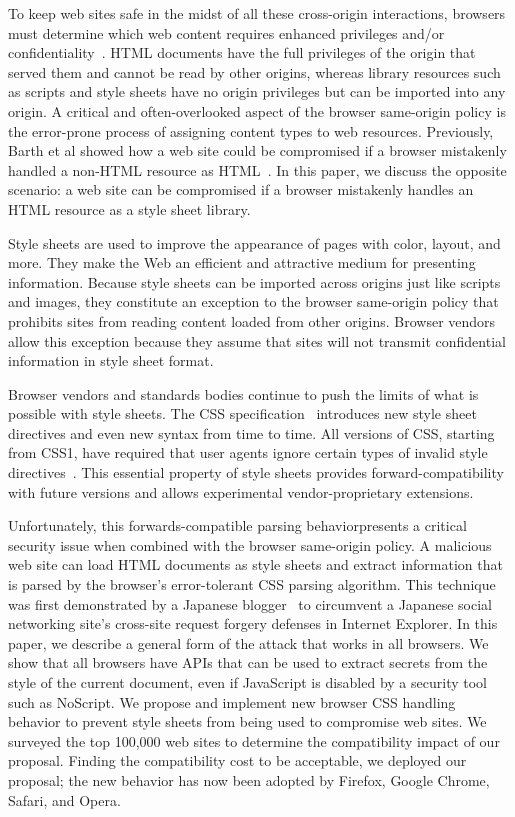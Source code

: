 \documentclass{acm_proc_article-sp}
\begin{document}
To keep web sites safe in the midst of all these cross-origin interactions,
browsers must determine which web content requires enhanced privileges and/or
confidentiality~\cite{mashupos}. HTML documents have the full privileges of
the origin that served them and cannot be read by other origins, whereas
library resources such as scripts and style sheets have no origin privileges
but can be imported into any origin. A critical and often-overlooked aspect of
the browser same-origin policy is the error-prone process of assigning content types to web resources. Previously, Barth et al showed how a web site could be
compromised if a browser mistakenly handled a non-HTML resource as
HTML~\cite{securecontentsniffing}. In this paper, we discuss the opposite
scenario: a web site can be compromised if a browser mistakenly handles an
HTML resource as a style sheet library.

Style sheets are used to improve the appearance of pages with
color, layout, and more. They make the Web an efficient and attractive medium
for presenting information. Because style sheets can be imported across
origins just like scripts and images, they constitute an exception to the
browser same-origin policy that prohibits sites from reading content loaded
from other origins. Browser vendors allow this exception because they assume
that sites will not transmit confidential information in style sheet format.

Browser vendors and standards bodies continue to push the limits of what is
possible with style sheets. The CSS specification~\cite{cssspec} introduces
new style sheet directives and even new syntax from time to time. All versions
of CSS, starting from CSS1, have required that user agents ignore certain
types of invalid style directives~\cite{syndata}. This essential property of style sheets
provides forward-compatibility with future versions and allows experimental
vendor-proprietary extensions.

Unfortunately, this forwards-compatible parsing behavior\linebreak presents a critical
security issue when combined with the browser same-origin policy. A malicious
web site can load HTML documents as style sheets and extract information that
is parsed by the browser's error-tolerant CSS parsing algorithm. This
technique was first demonstrated by a Japanese blogger~\cite{cssxss} to
circumvent a Japanese social networking site's cross-site request forgery
defenses in Internet Explorer. In this paper, we describe a general form of
the attack that works in all browsers. We show that all browsers have APIs
that can be used to extract secrets from the style of the current document,
even if JavaScript is disabled by a security tool such as NoScript. We propose
and implement new browser CSS handling behavior to prevent style sheets from
being used to compromise web sites. We surveyed the top 100,000 web sites to
determine the compatibility impact of our proposal. Finding the compatibility
cost to be acceptable, we deployed our proposal; the new behavior has now been
adopted by Firefox, Google Chrome, Safari, and Opera.
\end{document}
